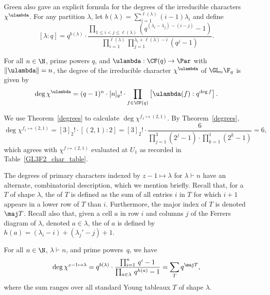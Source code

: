 Green also gave an explicit formula for the degrees of the irreducible characters $\chi^\ulambda$.
For any partition $\lambda$, let $b(\lambda) = \sum_{i=1}^{\ell(\lambda)} (i-1)\lambda_i$ and define
\begin{equation}
\left [ \lambda : q \right ] = q^{b(\lambda)} \cdot \frac{\prod_{1 \leq i < j \leq \ell(\lambda)} \left ( q^{(\lambda_i - \lambda_j) - (i - j)} - 1 \right )}{\prod_{i=1}^{\ell(\lambda)} \prod_{j=1}^{\lambda_i + \ell(\lambda) - i} (q^j-1)}.
\end{equation}

\begin{theorem}
\label{degrees}
For all \(n \in \N\), prime powers \(q\), and $\ulambda : \CF (q) \to \Par$ with $\| \ulambda \| = n$,
the degree of the irreducible character $\chi^\ulambda$ of $\GL_n \F_q$ is given by
\begin{equation}
\deg \chi^\ulambda = (q-1)^n \cdot [n]_q! \cdot \prod_{f \in \CF (q)} \left [ \ulambda (f) : q^{\deg f} \right ].
\end{equation}
\end{theorem}

\begin{example}
We use Theorem~\ref{degrees} to calculate $\deg \chi^{f_1 \mapsto (2,1)}$.
By Theorem~\ref{degrees},
\[
\deg \chi^{f_1 \mapsto (2,1)}
=
[3]_2! \cdot [(2,1): 2]
=
[3]_2! \cdot \frac{6}{\prod_{j=1}^3 (2^j-1) \cdot \prod_{k=1}^1 (2^k-1)} = 6,
\]
which agrees with \(\chi^{f \mapsto (2,1)}\) evaluated at \(U_1\) as recorded in Table~\ref{GL3F2_char_table}.
\end{example}



The degrees of primary characters indexed by \(z-1 \mapsto \lambda\) for \(\lambda \vdash n\) have an alternate, combinatorial description, which we mention briefly.
Recall that, for a  \(T\) of shape \(\lambda\), the  of \(T\) is defined as the sum of all entries \(i\) in \(T\) for which \(i + 1\) appears in a lower row of \(T\) than \(i\).
Furthermore, the major index of \(T\) is denoted \(\maj T\).
Recall also that, given a cell \(a\) in row \(i\) and columns \(j\) of the Ferrers diagram of \(\lambda\), denoted \(a \in \lambda\), the  of \(a\) is defined by \(h(a) = (\lambda_i - i) + (\lambda_j' - j) + 1\).
\begin{theorem}
For all \(n \in \N\), \(\lambda \vdash n\), and prime powers~\(q\), we have
\begin{equation}
\deg \chi^{z-1 \mapsto \lambda} = q^{b(\lambda)} \cdot \frac{\prod_{i=1}^n \, q^i - 1}{\prod_{a \in \lambda} \, q^{h(a)} - 1} = \sum_{T} q^{\maj T},
\end{equation}
where the sum ranges over all standard Young tableaux \(T\) of shape \(\lambda\).
\end{theorem}


















